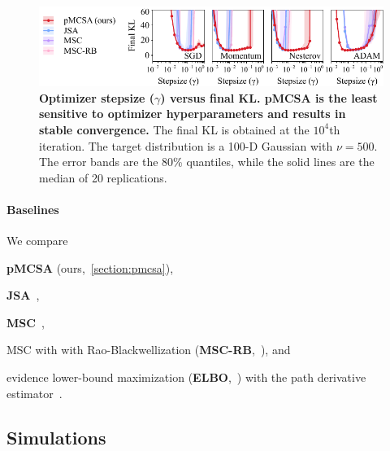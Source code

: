 \begin{figure}[t]
  \vspace{-2ex}
  \centering
  \includegraphics[scale=1.0]{figures/stepsize_01.pdf}
  \caption{\textbf{Optimizer stepsize (\(\gamma\)) versus final KL.
      pMCSA is the least sensitive to optimizer hyperparameters and results in stable convergence.}
      The final KL is obtained at the \(10^4\)th iteration.
      The target distribution is a 100-D Gaussian with \(\nu = 500\).
      The error bands are the 80\% quantiles, while the solid lines are the median of 20 replications.
  }\label{fig:stepsize}
  \vspace{-2ex}
\end{figure}


\vspace{-0.1in}
\paragraph{Baselines}
We compare
\begin{enumerate*}[label=\textbf{(\roman*)}]
  \item \textbf{pMCSA} (ours,~\cref{section:pmcsa}),
  \item \textbf{JSA}~\citep{pmlr-v124-ou20a},
  \item \textbf{MSC}~\citep{NEURIPS2020_b2070693},
  \item MSC with with Rao-Blackwellization (\textbf{MSC-RB},~\citealt{NEURIPS2020_b2070693}), and
  \item evidence lower-bound maximization (\textbf{ELBO},~\citealt{pmlr-v33-ranganath14, JMLR:v18:16-107}) with the path derivative estimator~\citep{NIPS2017_e91068ff}.
\end{enumerate*}

\vspace{-0.1in}
\subsection{Simulations}\label{section:simulation}

